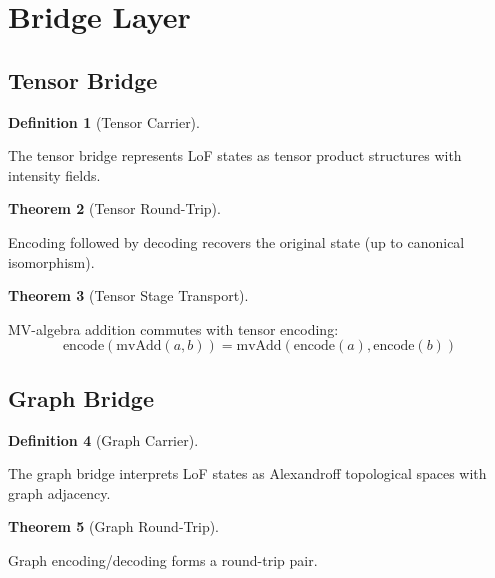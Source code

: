 \documentclass{amsart}
\theoremstyle{definition}
\newtheorem{definition}{Definition}[section]
\newtheorem{theorem}[definition]{Theorem}
\theoremstyle{remark}
\begin{document}
\section{Bridge Layer}

\subsection{Tensor Bridge}
\label{sec:tensor-bridge}

\begin{definition}[Tensor Carrier]
\label{def:tensor-carrier}
\uses{}

The tensor bridge represents LoF states as tensor product structures with intensity fields.
\end{definition}

\begin{theorem}[Tensor Round-Trip]
\label{thm:tensor-rt}
\leanok
{}

Encoding followed by decoding recovers the original state (up to canonical isomorphism).
\end{theorem}

\begin{theorem}[Tensor Stage Transport]
\label{thm:tensor-stage}
\leanok
{}

MV-algebra addition commutes with tensor encoding:
\[
\text{encode}(\text{mvAdd}(a, b)) = \text{mvAdd}(\text{encode}(a), \text{encode}(b))
\]
\end{theorem}

\subsection{Graph Bridge}
\label{sec:graph-bridge}

\begin{definition}[Graph Carrier]
\label{def:graph-carrier}
\uses{}

The graph bridge interprets LoF states as Alexandroff topological spaces with graph adjacency.
\end{definition}

\begin{theorem}[Graph Round-Trip]
\label{thm:graph-rt}
\leanok
{}

Graph encoding/decoding forms a round-trip pair.
\end{theorem}
\end{document}
